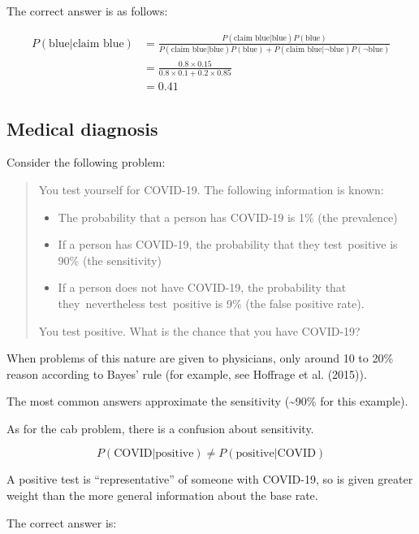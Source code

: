 \documentclass[
  letterpaper,
  DIV=11,
  numbers=noendperiod]{scrreprt}
\begin{document}
The correct answer is as follows:

\begin{align*}
P(\text{blue}|\text{claim blue})&=\frac{P(\text{claim blue}|\text{blue})P(\text{blue})}{P(\text{claim blue}|\text{blue})P(\text{blue})+P(\text{claim blue}|\neg\text{blue})P(\neg\text{blue})} \\[12pt]
&=\frac{0.8\times 0.15}{0.8\times 0.1+0.2\times 0.85} \\[12pt]
&=0.41
\end{align*}

\hypertarget{medical-diagnosis}{%
\subsection{Medical diagnosis}\label{medical-diagnosis}}

Consider the following problem:

\begin{quote}
You test yourself for COVID-19. The following information is known:

\begin{itemize}
\item
  The probability that a person has COVID-19 is 1\% (the prevalence)
\item
  If a person has COVID-19, the probability that they test~positive is
  90\% (the sensitivity)
\item
  If a person does not have COVID-19, the probability that
  they~nevertheless test~positive is 9\% (the false positive rate).
\end{itemize}

You test positive. What is the chance that you have COVID-19?
\end{quote}

When problems of this nature are given to physicians, only around 10 to
20\% reason according to Bayes' rule (for example, see Hoffrage et al.
(2015)).

The most common answers approximate the sensitivity (\textasciitilde90\%
for this example).

As for the cab problem, there is a confusion about sensitivity.

\[
P(\text{COVID}|\text{positive})\neq P(\text{positive}|\text{COVID})
\]

A positive test is ``representative'' of someone with COVID-19, so is
given greater weight than the more general information about the base
rate.

The correct answer is:
\end{document}
